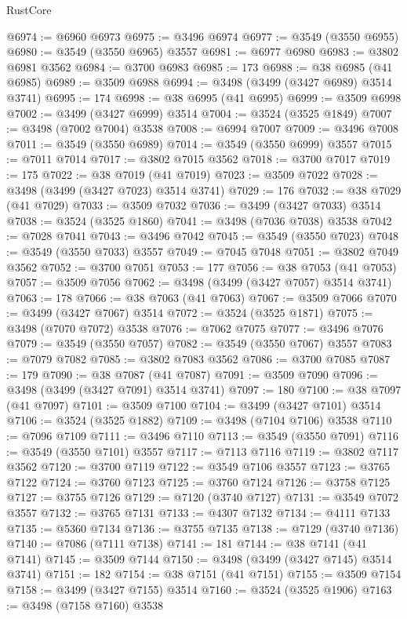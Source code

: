 \begin{lexlean}{RustCore}
\begin{coremodule}
@6974 := @6960 @6973
@6975 := @3496 @6974
@6977 := @3549 (@3550 @6955)
@6980 := @3549 (@3550 @6965) @3557
@6981 := @6977 @6980
@6983 := @3802 @6981 @3562
@6984 := @3700 @6983
@6985 := 173
@6988 := @38 @6985 (@41 @6985)
@6989 := @3509 @6988
@6994 := @3498 (@3499 (@3427 @6989) @3514 @3741)
@6995 := 174
@6998 := @38 @6995 (@41 @6995)
@6999 := @3509 @6998
@7002 := @3499 (@3427 @6999) @3514
@7004 := @3524 (@3525 @1849)
@7007 := @3498 (@7002 @7004) @3538
@7008 := @6994 @7007
@7009 := @3496 @7008
@7011 := @3549 (@3550 @6989)
@7014 := @3549 (@3550 @6999) @3557
@7015 := @7011 @7014
@7017 := @3802 @7015 @3562
@7018 := @3700 @7017
@7019 := 175
@7022 := @38 @7019 (@41 @7019)
@7023 := @3509 @7022
@7028 := @3498 (@3499 (@3427 @7023) @3514 @3741)
@7029 := 176
@7032 := @38 @7029 (@41 @7029)
@7033 := @3509 @7032
@7036 := @3499 (@3427 @7033) @3514
@7038 := @3524 (@3525 @1860)
@7041 := @3498 (@7036 @7038) @3538
@7042 := @7028 @7041
@7043 := @3496 @7042
@7045 := @3549 (@3550 @7023)
@7048 := @3549 (@3550 @7033) @3557
@7049 := @7045 @7048
@7051 := @3802 @7049 @3562
@7052 := @3700 @7051
@7053 := 177
@7056 := @38 @7053 (@41 @7053)
@7057 := @3509 @7056
@7062 := @3498 (@3499 (@3427 @7057) @3514 @3741)
@7063 := 178
@7066 := @38 @7063 (@41 @7063)
@7067 := @3509 @7066
@7070 := @3499 (@3427 @7067) @3514
@7072 := @3524 (@3525 @1871)
@7075 := @3498 (@7070 @7072) @3538
@7076 := @7062 @7075
@7077 := @3496 @7076
@7079 := @3549 (@3550 @7057)
@7082 := @3549 (@3550 @7067) @3557
@7083 := @7079 @7082
@7085 := @3802 @7083 @3562
@7086 := @3700 @7085
@7087 := 179
@7090 := @38 @7087 (@41 @7087)
@7091 := @3509 @7090
@7096 := @3498 (@3499 (@3427 @7091) @3514 @3741)
@7097 := 180
@7100 := @38 @7097 (@41 @7097)
@7101 := @3509 @7100
@7104 := @3499 (@3427 @7101) @3514
@7106 := @3524 (@3525 @1882)
@7109 := @3498 (@7104 @7106) @3538
@7110 := @7096 @7109
@7111 := @3496 @7110
@7113 := @3549 (@3550 @7091)
@7116 := @3549 (@3550 @7101) @3557
@7117 := @7113 @7116
@7119 := @3802 @7117 @3562
@7120 := @3700 @7119
@7122 := @3549 @7106 @3557
@7123 := @3765 @7122
@7124 := @3760 @7123
@7125 := @3760 @7124
@7126 := @3758 @7125
@7127 := @3755 @7126
@7129 := @7120 (@3740 @7127)
@7131 := @3549 @7072 @3557
@7132 := @3765 @7131
@7133 := @4307 @7132
@7134 := @4111 @7133
@7135 := @5360 @7134
@7136 := @3755 @7135
@7138 := @7129 (@3740 @7136)
@7140 := @7086 (@7111 @7138)
@7141 := 181
@7144 := @38 @7141 (@41 @7141)
@7145 := @3509 @7144
@7150 := @3498 (@3499 (@3427 @7145) @3514 @3741)
@7151 := 182
@7154 := @38 @7151 (@41 @7151)
@7155 := @3509 @7154
@7158 := @3499 (@3427 @7155) @3514
@7160 := @3524 (@3525 @1906)
@7163 := @3498 (@7158 @7160) @3538

\end{coremodule}
\end{lexlean}
